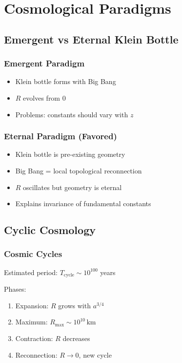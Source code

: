 \documentclass[12pt,a4paper]{article}
\begin{document}
\section{Cosmological Paradigms}
\label{sec:paradigms}

\subsection{Emergent vs Eternal Klein Bottle}

\subsubsection{Emergent Paradigm}

\begin{itemize}
    \item Klein bottle forms with Big Bang
    \item $R$ evolves from 0
    \item Problems: constants should vary with $z$
\end{itemize}

\subsubsection{Eternal Paradigm (Favored)}

\begin{itemize}
    \item Klein bottle is pre-existing geometry
    \item Big Bang = local topological reconnection
    \item $R$ oscillates but geometry is eternal
    \item Explains invariance of fundamental constants
\end{itemize}

\subsection{Cyclic Cosmology}

\subsubsection{Cosmic Cycles}

Estimated period: $T_\mathrm{cycle} \sim 10^{100}$ years

Phases:
\begin{enumerate}
    \item Expansion: $R$ grows with $a^{3/4}$
    \item Maximum: $R_\mathrm{max} \sim 10^{10}\,\mathrm{km}$
    \item Contraction: $R$ decreases
    \item Reconnection: $R \to 0$, new cycle
\end{enumerate}
\end{document}
